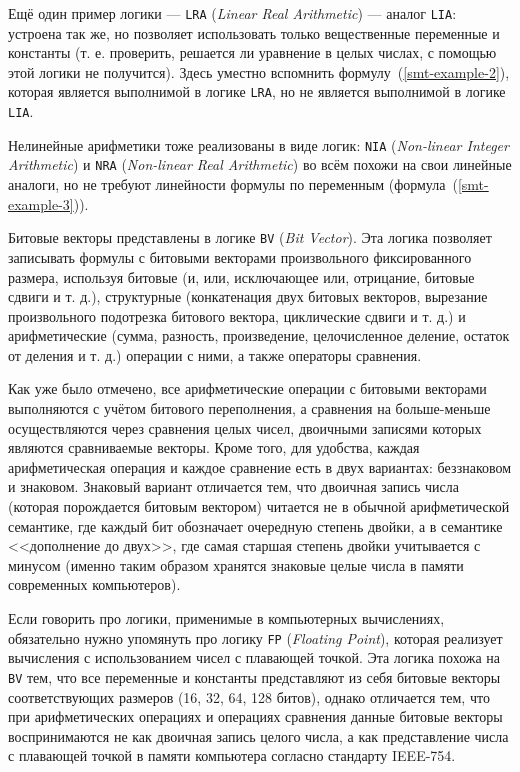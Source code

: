 Ещё один пример логики --- \texttt{LRA} (\textit{Linear Real Arithmetic}) --- аналог \texttt{LIA}: устроена так же, но позволяет использовать только вещественные переменные и константы (т. е. проверить, решается ли уравнение в целых числах, с помощью этой логики не получится). Здесь уместно вспомнить формулу~(\ref{smt-example-2}), которая является выполнимой в логике \texttt{LRA}, но не является выполнимой в логике \texttt{LIA}.

Нелинейные арифметики тоже реализованы в виде логик: \texttt{NIA} (\textit{Non-linear Integer Arithmetic}) и \texttt{NRA} (\textit{Non-linear Real Arithmetic}) во всём похожи на свои линейные аналоги, но не требуют линейности формулы по переменным (формула~(\ref{smt-example-3})).

Битовые векторы представлены в логике \texttt{BV} (\textit{Bit Vector}). Эта логика позволяет записывать формулы с битовыми векторами произвольного фиксированного размера, используя битовые (и, или, исключающее или, отрицание, битовые сдвиги и т. д.), структурные (конкатенация двух битовых векторов, вырезание произвольного подотрезка битового вектора, циклические сдвиги и т. д.) и арифметические (сумма, разность, произведение, целочисленное деление, остаток от деления и т. д.) операции с ними, а также операторы сравнения.

Как уже было отмечено, все арифметические операции с битовыми векторами выполняются с учётом битового переполнения, а сравнения на больше-меньше осуществляются через сравнения целых чисел, двоичными записями которых являются сравниваемые векторы. Кроме того, для удобства, каждая арифметическая операция и каждое сравнение есть в двух вариантах: беззнаковом и знаковом. Знаковый вариант отличается тем, что двоичная запись числа (которая порождается битовым вектором) читается не в обычной арифметической семантике, где каждый бит обозначает очередную степень двойки, а в семантике <<дополнение до двух>>, где самая старшая степень двойки учитывается с минусом (именно таким образом хранятся знаковые целые числа в памяти современных компьютеров).

Если говорить про логики, применимые в компьютерных вычислениях, обязательно нужно упомянуть про логику \texttt{FP} (\textit{Floating Point}), которая реализует вычисления с использованием чисел с плавающей точкой. Эта логика похожа на \texttt{BV} тем, что все переменные и константы представляют из себя битовые векторы соответствующих размеров (16, 32, 64, 128 битов), однако отличается тем, что при арифметических операциях и операциях сравнения данные битовые векторы воспринимаются не как двоичная запись целого числа, а как представление числа с плавающей точкой в памяти компьютера согласно стандарту IEEE-754.

